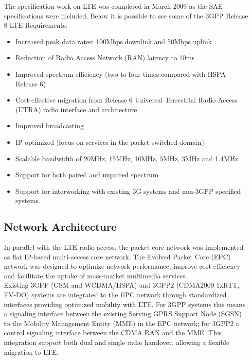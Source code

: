 The specification work on LTE was completed in March 2009 as the SAE specifications
were included. Below it is possible to see some of the 3GPP Release 8 LTE Requirements:

\begin{itemize}
    \item Increased peak data rates: 100Mbps downlink and 50Mbps uplink
    \item Reduction of Radio Access Network (RAN) latency to 10ms
    \item Improved spectrum efficiency (two to four times compared with HSPA Release 6)
    \item Cost-effective migration from Release 6 Universal Terrestrial Radio
    Access (UTRA) radio interface and architecture
    \item Improved broadcasting
    \item IP-optimized (focus on services in the packet switched domain)
    \item Scalable bandwidth of 20MHz, 15MHz, 10MHz, 5MHz, 3MHz and 1.4MHz
    \item Support for both paired and unpaired spectrum
    \item Support for interworking with existing 3G systems and non-3GPP specified systems.
\end{itemize}

\subsection{Network Architecture}

In parallel with the LTE radio access, the packet core network was implemented as
flat IP-based multi-access core network. The Evolved Packet Core (EPC) network was
designed to optimize network performance, improve cost-efficiency and facilitate
the uptake of mass-market multimedia services.\\

Existing 3GPP (GSM and WCDMA/HSPA) and 3GPP2 (CDMA2000 1xRTT, EV-DO) systems are
integrated to the EPC network through standardized interfaces providing optimized
mobility with LTE. For 3GPP systems this means a signaling interface between the
existing Serving GPRS Support Node (SGSN) to the Mobility Management Entity (MME)
in the EPC network; for 3GPP2 a control signaling interface between the CDMA RAN
and the MME. This integration support both dual and single radio handover, allowing
a flexible migration to LTE.\\

